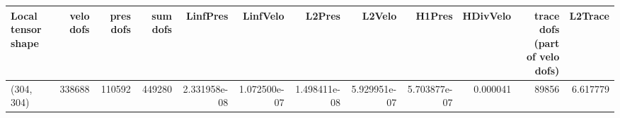 \begin{tabular}{lrrrrrrrrrrr}
\toprule
Local tensor shape &  velo dofs &  pres dofs &  sum dofs &     LinfPres &     LinfVelo &       L2Pres &       L2Velo &       H1Pres &  HDivVelo &  trace dofs (part of velo dofs) &  L2Trace \\
\midrule
        (304, 304) &     338688 &     110592 &    449280 & 2.331958e-08 & 1.072500e-07 & 1.498411e-08 & 5.929951e-07 & 5.703877e-07 &  0.000041 &                           89856 & 6.617779 \\
\bottomrule
\end{tabular}
